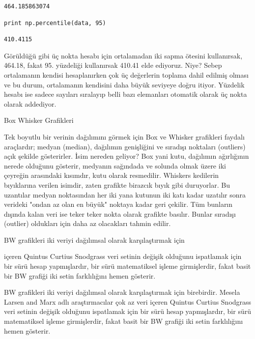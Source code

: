 \documentclass[12pt,fleqn]{article}\usepackage{../../common}
\begin{document}
\begin{verbatim}
464.185863074
\end{verbatim}

\begin{verbatim}
print np.percentile(data, 95)
\end{verbatim}

\begin{verbatim}
410.4115
\end{verbatim}

Görüldüğü gibi üç nokta hesabı için ortalamadan iki sapma ötesini
kullanırsak, 464.18, fakat 95. yüzdeliği kullanırsak 410.41 elde
ediyoruz. Niye? Sebep ortalamanın kendisi hesaplanırken çok üç
değerlerin toplama dahil edilmiş olması ve bu durum, ortalamanın
kendisini daha büyük seviyeye doğru itiyor. Yüzdelik hesabı ise sadece
sayıları sıralayıp belli bazı elemanları otomatik olarak üç nokta
olarak addediyor.

Box Whisker Grafikleri

Tek boyutlu bir verinin dağılımını görmek için Box ve Whisker grafikleri
faydalı araçlardır; medyan (median), dağılımın genişliğini ve sıradışı
noktaları (outliers) açık şekilde gösterirler. İsim nereden geliyor? Box
yani kutu, dağılımın ağırlığının nerede olduğunu gösterir, medyanın
sağındada ve solunda olmak üzere iki çeyreğin arasındaki kısımdır, kutu
olarak resmedilir. Whiskers kedilerin bıyıklarına verilen isimdir, zaten
grafikte birazcık bıyık gibi duruyorlar. Bu uzantılar medyan noktasından
her iki yana kutunun iki katı kadar uzatılır sonra verideki "ondan az olan
en büyük" noktaya kadar geri çekilir. Tüm bunların dışında kalan veri ise
teker teker nokta olarak grafikte basılır. Bunlar sıradışı (outlier)
oldukları için daha az olacakları tahmin edilir.

BW grafikleri iki veriyi dağılımsal olarak karşılaştırmak için

içeren Quintus Curtius Snodgrass veri setinin değişik olduğunu
ispatlamak için bir sürü hesap yapmışlardır, bir sürü matematiksel
işleme girmişlerdir, fakat basit bir BW grafiği iki setin farklılığını
hemen gösterir.

BW grafikleri iki veriyi dağılımsal olarak karşılaştırmak için
birebirdir. Mesela Larsen and Marx adlı araştırmacılar çok az veri
içeren Quintus Curtius Snodgrass veri setinin değişik olduğunu
ispatlamak için bir sürü hesap yapmışlardır, bir sürü matematiksel
işleme girmişlerdir, fakat basit bir BW grafiği iki setin farklılığını
hemen gösterir.
\end{document}
